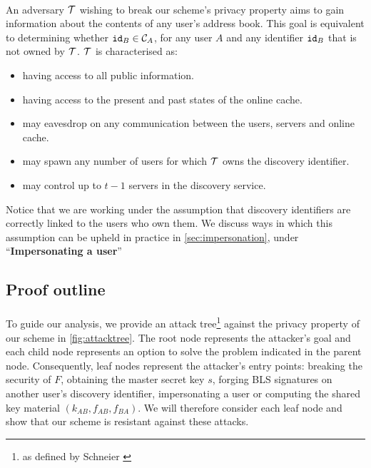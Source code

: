 	\paragraph{} An adversary $\mathcal{T}$ wishing to break our scheme's privacy property aims to gain information about the contents of any user's address book. This goal is equivalent to determining whether $\mathtt{id}_B \in \mathcal{C}_{A}$, for any user $A$ and any identifier $\mathtt{id}_B$ that is not owned by $\mathcal{T}$. $\mathcal{T}$ is characterised as:
	\begin{itemize}
		\item having access to all public information.
		\item having access to the present and past states of the online cache.
		\item may eavesdrop on any communication between the users, servers and online cache.
		\item may spawn any number of users for which $\mathcal{T}$ owns the discovery identifier.
		\item may control up to $t-1$ servers in the discovery service.
	\end{itemize}
	
	\noindent Notice that we are working under the assumption that discovery identifiers are correctly linked to the users who own them. We discuss ways in which this assumption can be upheld in practice in \autoref{sec:impersonation}, under ``\textbf{Impersonating a user}''
	
	\subsection{Proof outline}
	
	\paragraph{} To guide our analysis, we provide an attack tree\footnote{as defined by Schneier \cite{attacktree}} against the privacy property of our scheme in \autoref{fig:attacktree}. The root node represents the attacker's goal and each child node represents an option to solve the problem indicated in the parent node. Consequently, leaf nodes represent the attacker's entry points: breaking the security of $F$, obtaining the master secret key $s$, forging BLS signatures on another user's discovery identifier, impersonating a user or computing the shared key material $(k_{AB}, f_{AB}, f_{BA})$. We will therefore consider each leaf node and show that our scheme is resistant against these attacks.
	
